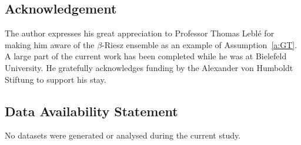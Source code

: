 \documentclass[11pt,letterpaper]{amsart}
\newcommand{\dom}[1]{\mathcal D(#1)}
\newcommand{\diff}{\mathop{}\!\mathrm{d}}
\newcommand{\N}{{\mathbb N}}
\newcommand{\R}{{\mathbb R}}
\newcommand{\comma}{\,\,\mathrm{,}\;\,}
\newcommand{\fstop}{\,\,\mathrm{.}}
\newcommand{\cdc}{\Gamma}
\newcommand{\QP}{{\mu}}
\newcommand{\dUpsilon}{{\mathbf \Upsilon}}
\newcommand{\U}{\dUpsilon}
\newcommand{\E}{\mathcal E}
\renewcommand{\1}{\mathbf 1}
\numberwithin{equation}{section}
\theoremstyle{plain}
\theoremstyle{definition}
\theoremstyle{remark}
\begin{document}
%



\subsection*{Acknowledgement}
The author expresses his great appreciation to Professor Thomas Lebl\'e for making him aware of the $\beta$-Riesz ensemble as an example of Assumption~\ref{a:GT}.
A large part of the current work has been completed while he was at Bielefeld University.  He gratefully acknowledges funding by the Alexander von Humboldt Stiftung to support his stay.

\subsection*{Data Availability Statement}
No datasets were generated or analysed during the current study.
\end{document}
